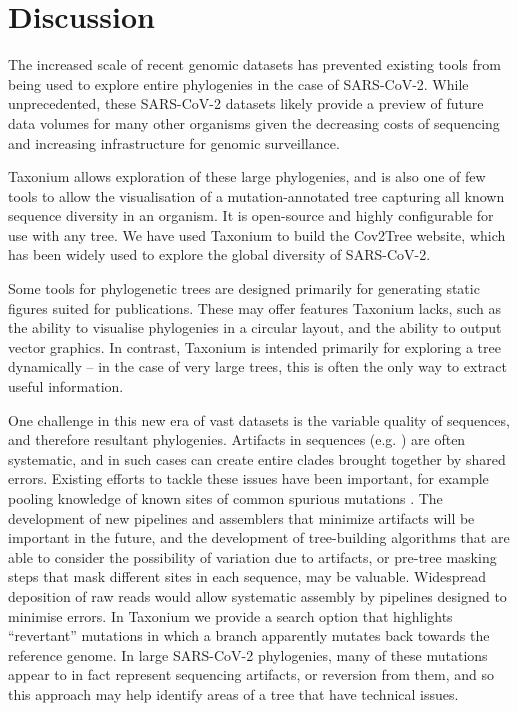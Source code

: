 \documentclass[twocolumn]{bioRxiv}
\begin{document}
\section*{Discussion}\label{s:discussion}

The increased scale of recent genomic datasets has prevented existing tools from being used to explore entire phylogenies in the case of SARS-CoV-2. While unprecedented, these SARS-CoV-2 datasets likely provide a preview of future data volumes for many other organisms given the decreasing costs of sequencing and increasing infrastructure for genomic surveillance.

Taxonium allows exploration of these large phylogenies, and is also one of few tools to allow the visualisation of a mutation-annotated tree capturing all known sequence diversity in an organism. It is open-source and highly configurable for use with any tree. We have used Taxonium to build the Cov2Tree website, which has been widely used to explore the global diversity of SARS-CoV-2.

Some tools for phylogenetic trees are designed primarily for generating static figures suited for publications. These may offer features Taxonium lacks, such as the ability to visualise phylogenies in a circular layout, and the ability to output vector graphics. In contrast, Taxonium is intended primarily for exploring a tree dynamically -- in the case of very large trees, this is often the only way to extract useful information.

One challenge in this new era of vast datasets is the variable quality of sequences, and therefore resultant phylogenies. Artifacts in sequences (e.g. \citet{pmid35130474,sanderson2021variation,sanderson2021systematic}) are often systematic, and in such cases can create entire clades brought together by shared errors. Existing efforts to tackle these issues have been important, for example pooling knowledge of known sites of common spurious mutations \citep{de2020masking}. The development of new pipelines and assemblers that minimize artifacts will be important in the future, and the development of tree-building algorithms that are able to consider the possibility of variation due to artifacts, or pre-tree masking steps that mask different sites in each sequence, may be valuable. Widespread deposition of raw reads would allow systematic assembly by pipelines designed to minimise errors. In Taxonium we provide a search option that highlights ``revertant'' mutations in which a branch apparently mutates back towards the reference genome. In large SARS-CoV-2 phylogenies, many of these mutations appear to in fact represent sequencing artifacts, or reversion from them, and so this approach may help identify areas of a tree that  have technical issues. 
\end{document}
